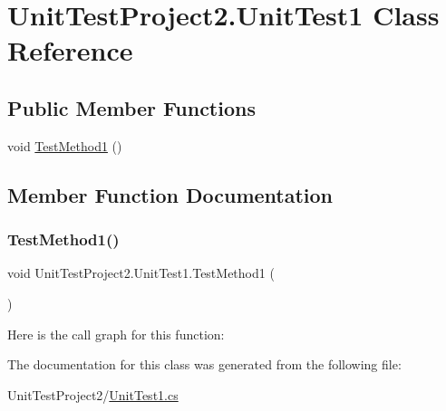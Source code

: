 \hypertarget{class_unit_test_project2_1_1_unit_test1}{}\section{Unit\+Test\+Project2.\+Unit\+Test1 Class Reference}
\label{class_unit_test_project2_1_1_unit_test1}
\subsection*{Public Member Functions}
\begin{DoxyCompactItemize}
\item 
void \hyperlink{class_unit_test_project2_1_1_unit_test1_afd2fde1878f1f371cb7c11b9eac2efd8}{Test\+Method1} ()
\end{DoxyCompactItemize}


\subsection{Member Function Documentation}
\mbox{\label{class_unit_test_project2_1_1_unit_test1_afd2fde1878f1f371cb7c11b9eac2efd8}} 
\subsubsection{\texorpdfstring{Test\+Method1()}{TestMethod1()}}
{\footnotesize\ttfamily void Unit\+Test\+Project2.\+Unit\+Test1.\+Test\+Method1 (\begin{DoxyParamCaption}{ }\end{DoxyParamCaption})}

Here is the call graph for this function\+:


The documentation for this class was generated from the following file\+:\begin{DoxyCompactItemize}
\item 
Unit\+Test\+Project2/\hyperlink{_unit_test1_8cs}{Unit\+Test1.\+cs}\end{DoxyCompactItemize}
